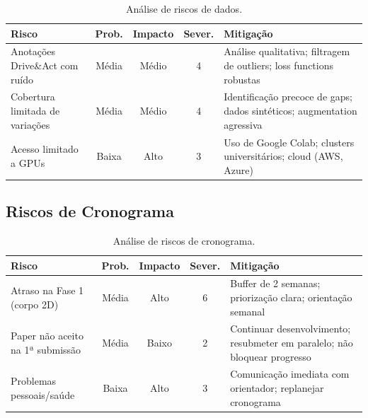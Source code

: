 \documentclass[12pt, a4paper]{article}
\begin{document}
\begin{table}[H]
    \centering
    \caption{Análise de riscos de dados.}
    \small
    \begin{tabular}{|p{3cm}|c|c|c|p{4cm}|}
        \hline
        \textbf{Risco} & \textbf{Prob.} & \textbf{Impacto} & \textbf{Sever.} & \textbf{Mitigação} \\ \hline
        
        Anotações Drive\&Act com ruído & 
        Média & 
        Médio & 
        4 & 
        Análise qualitativa; filtragem de outliers; loss functions robustas \\ \hline
        
        Cobertura limitada de variações & 
        Média & 
        Médio & 
        4 & 
        Identificação precoce de gaps; dados sintéticos; augmentation agressiva \\ \hline
        
        Acesso limitado a GPUs & 
        Baixa & 
        Alto & 
        3 & 
        Uso de Google Colab; clusters universitários; cloud (AWS, Azure) \\ \hline
        
    \end{tabular}
\end{table}

\subsection{Riscos de Cronograma}

\begin{table}[H]
    \centering
    \caption{Análise de riscos de cronograma.}
    \small
    \begin{tabular}{|p{3cm}|c|c|c|p{4cm}|}
        \hline
        \textbf{Risco} & \textbf{Prob.} & \textbf{Impacto} & \textbf{Sever.} & \textbf{Mitigação} \\ \hline
        
        Atraso na Fase 1 (corpo 2D) & 
        Média & 
        Alto & 
        6 & 
        Buffer de 2 semanas; priorização clara; orientação semanal \\ \hline
        
        Paper não aceito na 1ª submissão & 
        Média & 
        Baixo & 
        2 & 
        Continuar desenvolvimento; resubmeter em paralelo; não bloquear progresso \\ \hline
        
        Problemas pessoais/saúde & 
        Baixa & 
        Alto & 
        3 & 
        Comunicação imediata com orientador; replanejar cronograma \\ \hline
        
    \end{tabular}
\end{table}
\end{document}
